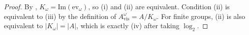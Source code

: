 \begin{proof}
By , $K_{\omega}=\mathrm{Im}(\mathrm{ev}_{\omega})$, so \textup{(i)} and \textup{(ii)} are equivalent. Condition \textup{(ii)} is equivalent to \textup{(iii)} by the definition of $A_{\mathrm{vis}}^{\omega}=A/K_{\omega}$. For finite groups, \textup{(ii)} is also equivalent to $|K_{\omega}|=|A|$, which is exactly \textup{(iv)} after taking $\log_2$.
\end{proof}
